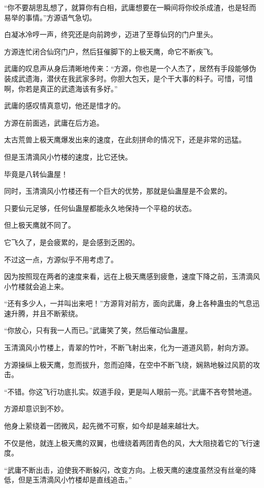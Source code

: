 \begin{this_body}
“你不要胡思乱想了，就算你有白相，武庸想要在一瞬间将你绞杀成渣，也是轻而易举的事情。”方源语气急切。

白凝冰冷哼一声，终究还是向前跨步，迈进了至尊仙窍的门户里头。

方源连忙闭合仙窍门户，然后狂催脚下的上极天鹰，命它不断疾飞。

武庸的叹息声从身后清晰地传来：“方源，你也是一个人杰了，居然有手段能够伪装成武遗海，潜伏在我武家多时。你胆大包天，是个干大事的料子。可惜，可惜啊，你若是真正的武遗海该有多好。”

武庸的感叹情真意切，他还是惜才的。

方源在前面逃，武庸在后方追。

太古荒兽上极天鹰爆发出来的速度，在此刻拼命的情况下，还是非常的迅猛。

但是玉清滴风小竹楼的速度，比它还快。

毕竟是八转仙蛊屋！

同时，玉清滴风小竹楼还有一个巨大的优势，那就是仙蛊屋是不会累的。

只要仙元足够，任何仙蛊屋都能永久地保持一个平稳的状态。

但上极天鹰就不同了。

它飞久了，是会疲累的，是会感到乏困的。

不过这一点，方源似乎不用考虑了。

因为按照现在两者的速度来看，远在上极天鹰感到疲惫，速度下降之前，玉清滴风小竹楼就会追上来。

“还有多少人，一并叫出来吧！”方源背对前方，面向武庸，身上各种蛊虫的气息迅速升腾，并且不断萦绕。

“你放心，只有我一人而已。”武庸笑了笑，然后催动仙蛊屋。

玉清滴风小竹楼上，青翠的竹叶，不断飞射出来，化为一道道风箭，射向方源。

方源操纵上极天鹰，忽而拔升，忽而迫降，在空中不断飞绕，娴熟地躲过风箭的攻击。

“不错。你这飞行功底扎实。奴道手段，更是叫人眼前一亮。”武庸不吝夸赞地道。

方源却意识到不妙。

他身上萦绕着一团微风，起先微不可察，如今却是越来越壮大。

不仅是他，就连上极天鹰的双翼，也缠绕着两团青色的风，大大阻挠着它的飞行速度。

“武庸不断出击，迫使我不断躲闪，改变方向。上极天鹰的速度虽然没有丝毫的降低，但是玉清滴风小竹楼却是直线追击。”


\end{this_body}
